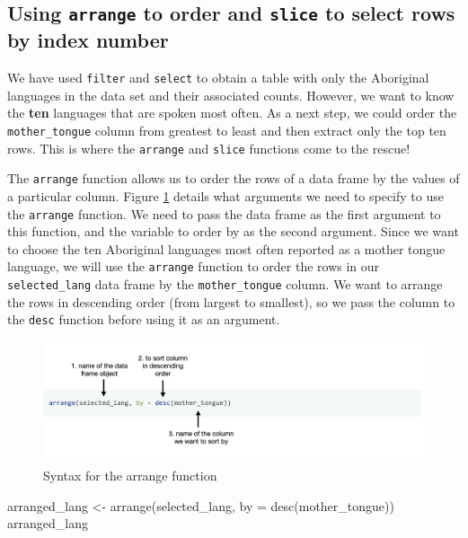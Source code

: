 \documentclass[
]{book}
\newenvironment{Shaded}{\begin{snugshade}}{\end{snugshade}}
\newcommand{\AttributeTok}[1]{\textcolor[rgb]{0.61,0.61,0.61}{#1}}
\newcommand{\FunctionTok}[1]{\textcolor[rgb]{0,0,0}{#1}}
\newcommand{\NormalTok}[1]{#1}
\newcommand{\OtherTok}[1]{\textcolor[rgb]{0.37,0.37,0.37}{#1}}
\begin{document}
\hypertarget{using-arrange-to-order-and-slice-to-select-rows-by-index-number}{%
\subsection{\texorpdfstring{Using \texttt{arrange} to order and \texttt{slice} to select rows by index number}{Using arrange to order and slice to select rows by index number}}\label{using-arrange-to-order-and-slice-to-select-rows-by-index-number}}

We have used \texttt{filter} and \texttt{select} to obtain a table with only the Aboriginal
languages in the data set and their associated counts. However, we want to know
the \textbf{ten} languages that are spoken most often. As a next step, we could
order the \texttt{mother\_tongue} column from greatest to least and then extract only
the top ten rows. This is where the \texttt{arrange} and \texttt{slice} functions come to the
rescue! 

The \texttt{arrange} function allows us to order the rows of a data frame by the
values of a particular column. Figure \ref{fig:img-arrange} details what arguments we need to specify to
use the \texttt{arrange} function. We need to pass the data frame as the first
argument to this function, and the variable to order by as the second argument.
Since we want to choose the ten Aboriginal languages most often reported as a mother tongue
language, we will use the \texttt{arrange} function to order the rows in our
\texttt{selected\_lang} data frame by the \texttt{mother\_tongue} column. We want to
arrange the rows in descending order (from largest to smallest),
so we pass the column to the \texttt{desc} function before using it as an argument.

\begin{figure}
\includegraphics[width=1000pt]{img/arrange_function} \caption{Syntax for the arrange function}\label{fig:img-arrange}
\end{figure}

\begin{Shaded}
\begin{Highlighting}[]
\NormalTok{arranged\_lang }\OtherTok{\textless{}{-}} \FunctionTok{arrange}\NormalTok{(selected\_lang, }\AttributeTok{by =} \FunctionTok{desc}\NormalTok{(mother\_tongue))}
\NormalTok{arranged\_lang}
\end{Highlighting}
\end{Shaded}
\end{document}
